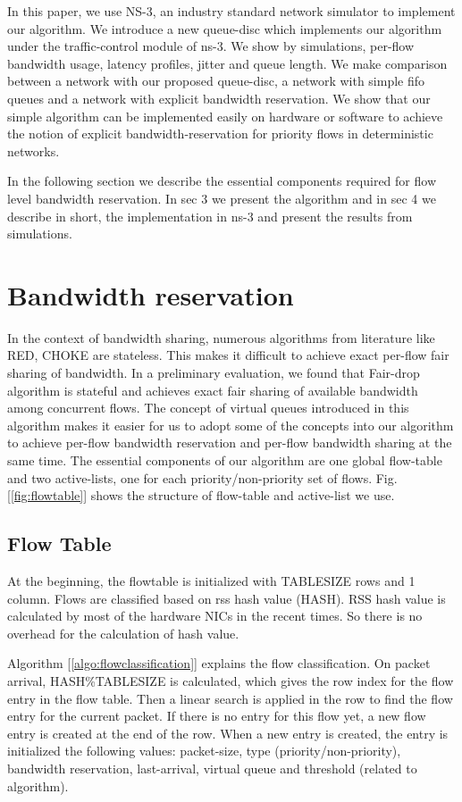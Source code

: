 \documentclass[10pt,sigconf,letterpaper,anonymous]{acmart}
\begin{document}
In this paper, we use NS-3, an industry standard network simulator to implement our algorithm. We introduce a new queue-disc which implements our algorithm under the traffic-control module of ns-3. We show by simulations, per-flow bandwidth usage, latency profiles, jitter and queue length. We make comparison between a network with our proposed queue-disc, a network with simple fifo queues and a network with explicit bandwidth reservation. We show that our simple algorithm can be implemented easily on hardware or software to achieve the notion of explicit bandwidth-reservation for priority flows in deterministic networks.

In the following section we describe the essential components required for flow level bandwidth reservation. In sec 3 we present the algorithm and in sec 4 we describe in short, the implementation in ns-3 and present the results from simulations.

\section{Bandwidth reservation}

In the context of bandwidth sharing, numerous algorithms from literature like RED, CHOKE are stateless. This makes it difficult to achieve exact per-flow fair sharing of bandwidth. In a preliminary evaluation, we found that Fair-drop algorithm \cite{c} is stateful and achieves exact fair sharing of available bandwidth among concurrent flows. The concept of virtual queues introduced in this algorithm makes it easier for us to adopt some of the concepts into our algorithm to achieve per-flow bandwidth reservation and per-flow bandwidth sharing at the same time. The essential components of our algorithm are one global flow-table and two active-lists, one for each priority/non-priority set of flows. Fig. [\ref{fig:flowtable}] shows the structure of flow-table and active-list we use.

\subsection{Flow Table}
At the beginning, the flowtable is initialized with TABLESIZE rows and 1 column. Flows are classified based on rss hash value (HASH). RSS hash value is calculated by most of the hardware NICs in the recent times. So there is no overhead for the calculation of hash value. 

Algorithm [\ref{algo:flowclassification}] explains the flow classification. On packet arrival, HASH\%TABLESIZE is calculated, which gives the row index for the flow entry in the flow table. Then a linear search is applied in the row to find the flow entry for the current packet. If there is no entry for this flow yet, a new flow entry is created at the end of the row.
When a new entry is created, the entry is initialized the following values: packet-size, type (priority/non-priority), bandwidth reservation, last-arrival, virtual queue and threshold (related to algorithm).
\end{document}
